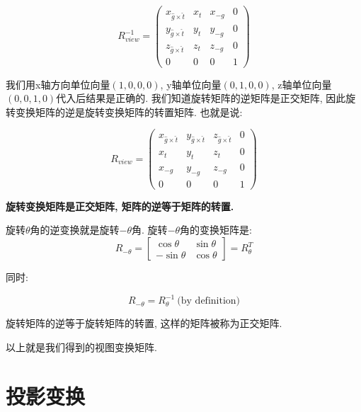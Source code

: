 \documentclass[openany]{progbookcn}
\begin{document}
\begin{equation}
	R^{-1}_{view}=\begin{pmatrix}x_{\hat{g}\times\hat{t}}&x_t&x_{-g}&0\\y_{\hat{g}\times\hat{t}}&y_t&y_{-g}&0\\z_{\hat{g}\times\hat{t}}&z_t&z_{-g}&0\\0&0&0&1\end{pmatrix}
\end{equation}

我们用x轴方向单位向量$(1,0,0,0)$, y轴单位向量$(0,1,0,0)$, z轴单位向量$(0,0,1,0)$代入后结果是正确的. 我们知道旋转矩阵的逆矩阵是正交矩阵, 因此旋转变换矩阵的逆是旋转变换矩阵的转置矩阵. 也就是说: 

\begin{equation}
	R_{view}=\begin{pmatrix}x_{\hat{g}\times\hat{t}}&y_{\hat{g}\times\hat{t}}&z_{\hat{g}\times\hat{t}}&0\\x_t&y_t&z_t&0\\x_{-g}&y_{-g}&z_{-g}&0\\0&0&0&1\end{pmatrix}
\end{equation}

\begin{information}
	\textbf{旋转变换矩阵是正交矩阵, 矩阵的逆等于矩阵的转置. }
	
	旋转$\theta$角的逆变换就是旋转$-\theta$角. 旋转$-\theta$角的变换矩阵是: 
	\begin{equation}
		R_{-\theta}=\begin{bmatrix}\cos\theta&\sin\theta\\-\sin\theta&\cos\theta\end{bmatrix} = R_{\theta}^T
	\end{equation}

	同时: 
	
	\begin{equation}
		R_{-\theta}=R_{\theta}^{-1}\ \text{(by definition)}
	\end{equation}

	旋转矩阵的逆等于旋转矩阵的转置, 这样的矩阵被称为正交矩阵. 

\end{information}

以上就是我们得到的视图变换矩阵. 

\section{投影变换}
\end{document}
